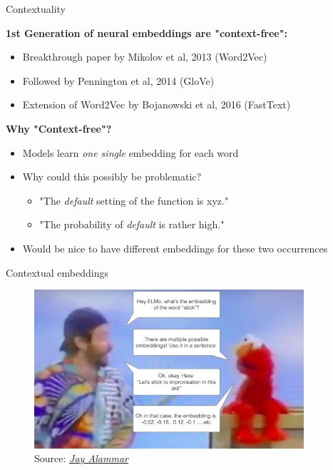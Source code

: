 \begin{vbframe}{Contextuality}

\vfill

\textbf{1st Generation of neural embeddings are "context-free":}

	\begin{itemize}
		\item Breakthrough paper by Mikolov et al, 2013 (Word2Vec)
		\item Followed by Pennington et al, 2014 (GloVe)
		\item Extension of Word2Vec by Bojanowski et al, 2016 (FastText)
	\end{itemize}
	
	\textbf{Why "Context-free"?}
	
	\begin{itemize}
		\item Models learn \textit{one single} embedding for each word
		\item Why could this possibly be problematic?
			\begin{itemize}
				\item "The \textit{default} setting of the function is xyz."
				\item "The probability of \textit{default} is rather high."
			\end{itemize}
		\item Would be nice to have different embeddings for these two occurrences
	\end{itemize}
	
\vfill

\end{vbframe}


\begin{vbframe}{Contextual embeddings}

\vfill

	\begin{figure}
		\centering
		\includegraphics[width = 10cm]{figure/elmo-embedding-robin-williams.png}\\ 
		\footnotesize{Source:} \href{https://jalammar.github.io/illustrated-bert/}{\footnotesize \it Jay Alammar}
	\end{figure}

\vfill

\end{vbframe}

